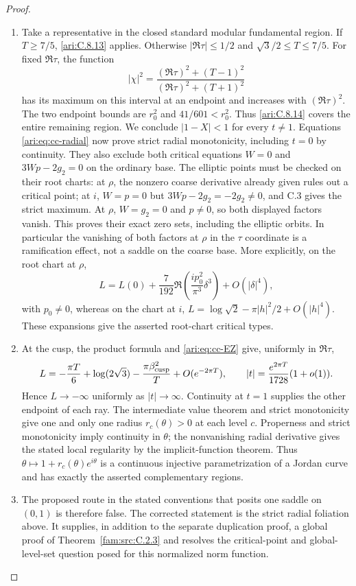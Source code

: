 \begin{proof}
\begin{enumerate}[label=\arabic*.,leftmargin=*]
\item Take a representative in the closed standard modular fundamental
region. If $T\ge7/5$, \ref{ari:C.8.13} applies. Otherwise
$|\Re\tau|\le1/2$ and $\sqrt3/2\le T\le7/5$. For fixed
$\Re\tau$, the function
\[
 |\chi|^2=\frac{(\Re\tau)^2+(T-1)^2}
                    {(\Re\tau)^2+(T+1)^2}
\]
has its maximum on this interval at an endpoint and increases
with $(\Re\tau)^2$. The two endpoint bounds are $r_0^2$
and $41/601<r_0^2$. Thus \ref{ari:C.8.14} covers the entire remaining
region. We conclude $|1-X|<1$ for every $t\ne1$.
Equations \eqref{ari:eq:cc-radial} now prove strict radial
monotonicity, including $t=0$ by continuity. They also exclude
both critical equations $W=0$ and $3Wp-2g_2=0$ on the
ordinary base. The elliptic points must be checked on their
root charts: at $\rho$, the nonzero coarse derivative already
given rules out a critical point; at $i$, $W=p=0$ but $3Wp-2g_2=-2g_2\ne0$, and C.3 gives
the strict maximum. At $\rho$, $W=g_2=0$ and $p\ne0$,
so both displayed factors vanish. This proves their exact zero
sets, including the elliptic orbits. In particular the vanishing of both factors at
$\rho$ in the $\tau$ coordinate is a ramification effect,
not a saddle on the coarse base. More explicitly, on the root
chart at $\rho$,
\[
 L=L(0)+\frac7{192}\Re\left(\frac{ip_0^2}{\pi^3}\delta^3\right)
                   +O(|\delta|^4),
\]
with $p_0\ne0$, whereas on the chart at $i$,
$L=\log\sqrt2-\pi|h|^2/2+O(|h|^4)$.
These expansions give the asserted root-chart critical types.

\item At the cusp, the product formula and \eqref{ari:eq:cc-EZ} give,
uniformly in $\Re\tau$,
\[
 L=-\frac{\pi T}{6}+\log(2\sqrt3)-
                      \frac{\pi\beta_{\rm cusp}^2}{T}+O(e^{-2\pi T}),
 \qquad |t|=\frac{e^{2\pi T}}{1728}(1+o(1)).
\]
Hence $L\to-\infty$ uniformly as $|t|\to\infty$.
Continuity at $t=1$ supplies the other endpoint of each ray.
The intermediate value theorem and strict monotonicity give
one and only one radius $r_c(\theta)>0$ at each level $c$.
Properness and strict monotonicity imply continuity in $\theta$;
the nonvanishing radial derivative gives the stated local
regularity by the implicit-function theorem. Thus
$\theta\mapsto1+r_c(\theta)e^{i\theta}$ is a continuous
injective parametrization of a Jordan curve and has exactly
the asserted complementary regions.

\item The proposed route in the stated conventions that posits one saddle on
$(0,1)$ is therefore false. The corrected statement is the
strict radial foliation above. It supplies, in addition to
the separate duplication proof, a global proof of Theorem~\ref{fam:src:C.2.3} and
resolves the critical-point and global-level-set question
posed for this normalized norm function.
\end{enumerate}
\end{proof}


